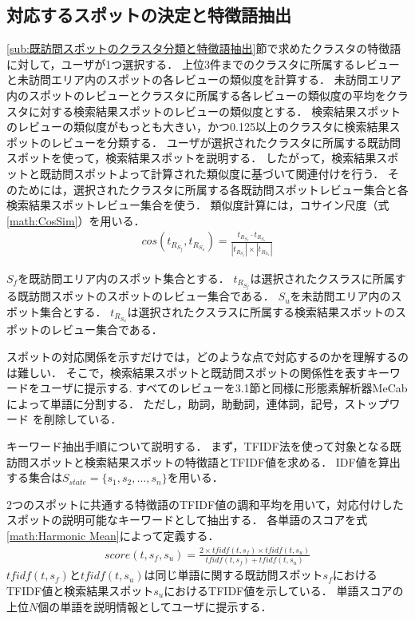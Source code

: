 \documentclass{deimj}
\begin{document}
\subsection{対応するスポットの決定と特徴語抽出}
\ref{sub:既訪問スポットのクラスタ分類と特徴語抽出}節で求めたクラスタの特徴語に対して，ユーザが1つ選択する．
上位3件までのクラスタに所属するレビューと未訪問エリア内のスポットの各レビューの類似度を計算する．
未訪問エリア内のスポットのレビューとクラスタに所属する各レビューの類似度の平均をクラスタに対する検索結果スポットのレビューの類似度とする．
検索結果スポットのレビューの類似度がもっとも大きい，かつ0.125以上のクラスタに検索結果スポットのレビューを分類する．
ユーザが選択されたクラスタに所属する既訪問スポットを使って，検索結果スポットを説明する．
したがって，検索結果スポットと既訪問スポットよって計算された類似度に基づいて関連付けを行う．
そのためには，選択されたクラスタに所属する各既訪問スポットレビュー集合と各検索結果スポットレビュー集合を使う．
類似度計算には，コサイン尺度（式\ref{math:CosSim}）を用いる．
\begin{eqnarray}
  cos(t_{R_{S_f}},t_{R_{S_u}})=\frac{t_{R_{S_f}} \cdot t_{R_{S_u}}}{|t_{R_{S_f}}| \times |t_{R_{S_u}}|}
  \label{math:CosSim}
\end{eqnarray}

$S_f$を既訪問エリア内のスポット集合とする．
$t_{R_{S_f}}$は選択されたクスラスに所属する既訪問スポットのスポットのレビュー集合である．
$S_u$を未訪問エリア内のスポット集合とする．
$t_{R_{S_u}}$は選択されたクスラスに所属する検索結果スポットのスポットのレビュー集合である．

スポットの対応関係を示すだけでは，どのような点で対応するのかを理解するのは難しい．
そこで，検索結果スポットと既訪問スポットの関係性を表すキーワードをユーザに提示する.
すべてのレビューを3.1節と同様に形態素解析器MeCabによって単語に分割する．
ただし，助詞，助動詞，連体詞，記号，ストップワード を削除している．

キーワード抽出手順について説明する．
まず，TFIDF法を使って対象となる既訪問スポットと検索結果スポットの特徴語とTFIDF値を求める．
IDF値を算出する集合は$S_{state} =\{s_1,s_2,\dots,s_n\}$を用いる．

2つのスポットに共通する特徴語のTFIDF値の調和平均を用いて，対応付けしたスポットの説明可能なキーワードとして抽出する．
各単語のスコアを式\ref{math:Harmonic Mean}によって定義する．
\begin{eqnarray}
  score(t,s_f,s_u) = \frac{2 \times tfidf(t,s_f) \times tfidf(t,s_u)}{tfidf(t,s_f) + tfidf(t,s_u)}
  \label{math:Harmonic Mean}
\end{eqnarray}
$tfidf(t,s_f)$と$tfidf(t,s_u)$は同じ単語に関する既訪問スポット$s_f$におけるTFIDF値と検索結果スポット$s_u$におけるTFIDF値を示している．
単語スコアの上位$N$個の単語を説明情報としてユーザに提示する．
\end{document}
